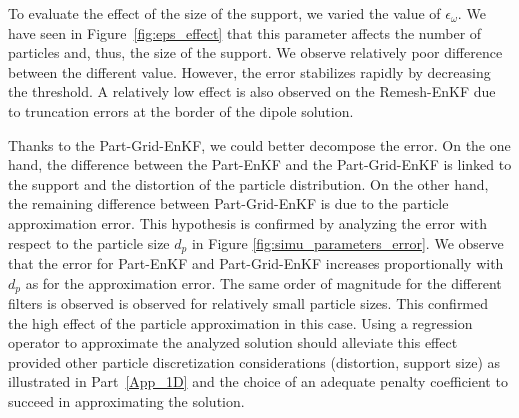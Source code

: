 To evaluate the effect of the size of the support, we varied the value of $\epsilon_{\omega}$. We have seen in Figure~\ref{fig:eps_effect} that this parameter affects the number of particles and, thus, the size of the support. We observe relatively poor difference between the different value. However, the error stabilizes rapidly by decreasing the threshold. A relatively low effect is also observed on the Remesh-EnKF due to truncation errors at the border of the dipole solution.

Thanks to the Part-Grid-EnKF, we could better decompose the error. On the one hand, the difference between the Part-EnKF and the Part-Grid-EnKF is linked to the support and the distortion of the particle distribution. On the other hand, the remaining difference between Part-Grid-EnKF is due to the particle approximation error. This hypothesis is confirmed by analyzing the error with respect to the particle size $d_p$ in Figure \ref{fig:simu_parameters_error}. We observe that the error for Part-EnKF and Part-Grid-EnKF increases proportionally with $d_p$ as for the approximation error. The same order of magnitude for the different filters is observed is observed for relatively small particle sizes. This confirmed the high effect of the particle approximation in this case. Using a regression operator to approximate the analyzed solution should alleviate this effect provided other particle discretization considerations (distortion, support size) as illustrated in Part~\ref{App_1D} and the choice of an adequate penalty coefficient to succeed in approximating the solution.

